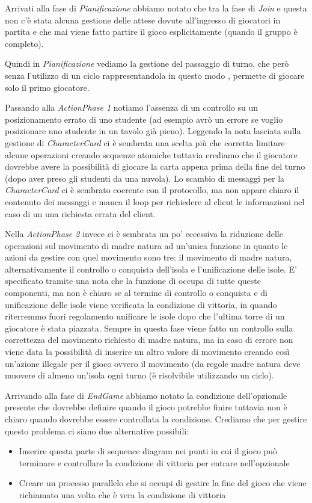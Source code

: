 \documentclass[12pt]{article}
\begin{document}
	Arrivati alla fase di \emph{Pianificazione} abbiamo notato che tra la fase di \emph{Join} e questa non c’è stata alcuna gestione delle attese dovute all’ingresso di giocatori in partita e che mai viene fatto partire il gioco esplicitamente (quando il gruppo è completo).
	
	Quindi in \emph{Pianificazione} vediamo la gestione del passaggio di turno, che però senza l’utilizzo di un ciclo rappresentandola in questo modo , permette di giocare solo il primo giocatore.
	
	Passando alla \emph{ActionPhase 1} notiamo l’assenza di un controllo su un posizionamento errato di uno studente (ad esempio avrò un errore se voglio posizionare uno studente in un tavolo già pieno). 
	Leggendo la nota lasciata sulla gestione di \emph{CharacterCard} ci è sembrata una scelta più che corretta limitare alcune operazioni creando sequenze atomiche tuttavia crediamo che il giocatore dovrebbe avere la possibilità di giocare la carta appena prima della fine del turno (dopo aver preso gli studenti da una nuvola). Lo scambio di messaggi per la \emph{CharacterCard} ci è sembrato coerente con il protocollo, ma non appare chiaro il contenuto dei messaggi e manca il loop per richiedere al client le informazioni nel caso di un una richiesta errata del client.
	
	Nella \emph{ActionPhase 2} invece ci è sembrata un po’ eccessiva la riduzione delle operazioni sul movimento di madre natura ad un’unica funzione in quanto le azioni da gestire con quel movimento sono tre: il movimento di madre natura, alternativamente il controllo o conquista dell’isola e l’unificazione delle isole. E’ specificato tramite una nota che la funzione di occupa di tutte queste componenti, ma non è chiaro se al termine di controllo o conquista e di unificazione delle isole viene verificata la condizione di vittoria, in quando riterremmo fuori regolamento unificare le isole dopo che l’ultima torre di un giocatore è stata piazzata.
	Sempre in questa fase viene fatto un controllo sulla correttezza del movimento richiesto di madre natura, ma in caso di errore non viene data la possibilità di inserire un altro valore di movimento creando così un’azione illegale per il gioco ovvero il movimento (da regole madre natura deve muovere di almeno un’isola ogni turno (è risolvibile utilizzando un ciclo).
	
	Arrivando alla fase di \emph{EndGame} abbiamo notato la condizione dell’opzionale presente che dovrebbe definire quando il gioco potrebbe finire tuttavia non è chiaro quando dovrebbe essere controllata la condizione. Crediamo che per gestire questo problema ci siano due alternative possibili:
	\begin{itemize}
		\item Inserire questa parte di sequence diagram nei punti in cui il gioco può terminare e controllare la condizione di vittoria per entrare nell’opzionale
		\item Creare un processo parallelo che si occupi di gestire la fine del gioco che viene richiamato una volta che è vera la condizione di vittoria
	\end{itemize}
	
\end{document}
